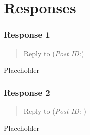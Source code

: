 \documentclass[12pt]{article}
\theoremstyle{definition}
\theoremstyle{plain}
\begin{document}
  \newpage
  \part{Responses}

    \section{Response 1}
      \begin{quote}
        Reply to \textbf{} (\textit{Post ID:})
      \end{quote}
      Placeholder

    \section{Response 2}
      \begin{quote}
        Reply to \textbf{} (\textit{Post ID: }) 
      \end{quote}
      Placeholder

  \newpage
  \nocite{textbook}
  \printbibliography[
    heading=bibintoc,
    title={Bibliography}
  ]
\end{document}
